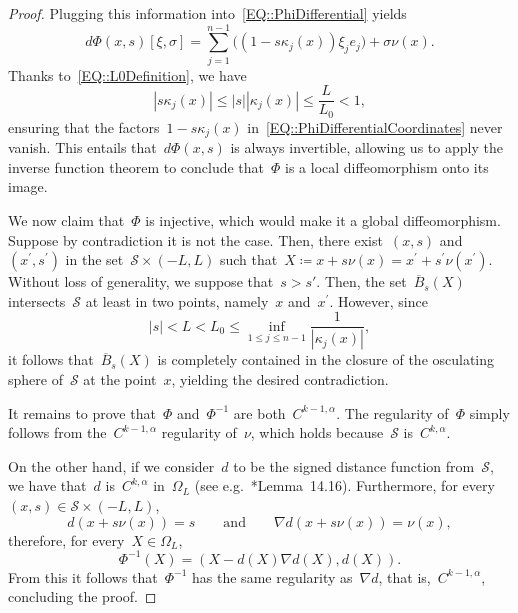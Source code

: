 \documentclass[12pt,a4paper]{amsart}
\numberwithin{equation}{section}
\theoremstyle{definition}
\theoremstyle{remark}
\newcommand{\abs}[1]{\left\lvert#1\right\rvert}
\renewcommand{\leq}{\leqslant}
\begin{document}
\begin{appendix}
\begin{proof}
    Plugging this information into~\eqref{EQ::PhiDifferential} yields
    \begin{equation}\label{EQ::PhiDifferentialCoordinates}
        d\Phi(x,s)[\xi, \sigma] = \sum_{j=1}^{n-1} \bigg((1-s\kappa_j(x))\xi_j e_j\bigg) + \sigma \nu(x).
    \end{equation}
    Thanks to~\eqref{EQ::L0Definition}, we have
    \begin{equation}\label{EQ::skappajSmall}
        \abs{s\kappa_j(x)} \leq \abs{s}\abs{\kappa_j(x)} \leq \frac{L}{L_0} < 1,
    \end{equation}
    ensuring that the factors~$1-s\kappa_j(x)$ in~\eqref{EQ::PhiDifferentialCoordinates} never vanish. This entails that~$d\Phi(x,s)$ is always invertible, allowing us to apply the inverse function theorem to conclude that~$\Phi$ is a local diffeomorphism onto its image.

    We now claim that~$\Phi$ is injective, which would make it a global diffeomorphism. Suppose by contradiction it is not the case. Then, there exist~$(x,s)$ and~$(x^\prime,s^\prime)$ in the set~$\mathcal{S} \times (-L,L)$ such that~$X \coloneq x+s\nu(x) = x^\prime + s^\prime\nu(x^\prime)$. Without loss of generality, we suppose that~$s > s \prime$. Then, the set~$\overline{B}_s(X)$ intersects~$\mathcal{S}$ at least in two points, namely~$x$ and~$x^\prime$. However, since
    \[\abs{s} < L < L_0 \leq \inf_{1\leq j\leq n-1}\frac{1}{\abs{\kappa_j(x)}},\]
    it follows that~$\overline{B}_s(X)$ is completely contained in the closure of the osculating sphere of~$\mathcal{S}$ at the point~$x$, yielding the desired contradiction.

    It remains to prove that~$\Phi$ and~$\Phi^{-1}$ are both~$C^{k-1,\alpha}$. The regularity of~$\Phi$ simply follows from the~$C^{k-1,\alpha}$ regularity of~$\nu$, which holds because~$\mathcal{S}$ is~$C^{k,\alpha}$.
    
    On the other hand, if we consider~$d$ to be the signed distance function from~$\mathcal{S}$, we have that~$d$ is~$C^{k,\alpha}$ in~$\Omega_L$ (see e.g.~\cite{MR1814364}*{Lemma~14.16}). Furthermore, for every~$(x,s)\in\mathcal{S} \times (-L,L)$,
    \begin{equation}
        d(x+s\nu(x)) = s\qquad\text{and}\qquad\nabla d(x+s\nu(x)) = \nu(x),
    \end{equation}
    therefore, for every~$X \in \Omega_L$,
    \begin{equation}
        \Phi^{-1}(X) = (X-d(X)\nabla d(X), d(X)).
    \end{equation}
    From this it follows that~$\Phi^{-1}$ has the same regularity as~$\nabla d$, that is,~$C^{k-1,\alpha}$, concluding the proof.
\end{proof}


\end{appendix}
\end{document}
